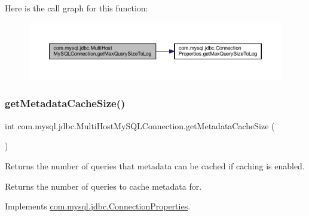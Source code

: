 Here is the call graph for this function\+:
\nopagebreak
\begin{figure}[H]
\begin{center}
\leavevmode
\includegraphics[width=350pt]{classcom_1_1mysql_1_1jdbc_1_1_multi_host_my_s_q_l_connection_a0f63e6682c67051a4e8ed58c16dd50fe_cgraph}
\end{center}
\end{figure}
\mbox{\label{classcom_1_1mysql_1_1jdbc_1_1_multi_host_my_s_q_l_connection_a7e4ed369659b3dc767551e7491496cfa}} 
\subsubsection{\texorpdfstring{get\+Metadata\+Cache\+Size()}{getMetadataCacheSize()}}
{\footnotesize\ttfamily int com.\+mysql.\+jdbc.\+Multi\+Host\+My\+S\+Q\+L\+Connection.\+get\+Metadata\+Cache\+Size (\begin{DoxyParamCaption}{ }\end{DoxyParamCaption})}

Returns the number of queries that metadata can be cached if caching is enabled.

\begin{DoxyReturn}{Returns}
the number of queries to cache metadata for. 
\end{DoxyReturn}


Implements \mbox{\hyperlink{interfacecom_1_1mysql_1_1jdbc_1_1_connection_properties_a980b503e0c8bf4b37a666526770ad043}{com.\+mysql.\+jdbc.\+Connection\+Properties}}.


